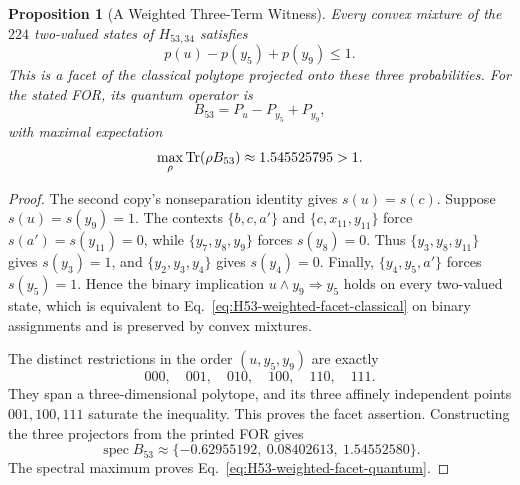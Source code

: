 \documentclass[aps,pra,reprint,superscriptaddress,longbibliography,nofootinbib,floatfix,10pt]{revtex4-2}
\newtheorem{proposition}[theorem]{Proposition}
\theoremstyle{definition}\newtheorem{definition}[theorem]{Definition}
\theoremstyle{remark}\newtheorem{remark}[theorem]{Remark}
\begin{document}
\begin{proposition}[A Weighted Three-Term Witness]\label{prop:H53-weighted-facet}
Every convex mixture of the $224$ two-valued states of $H_{53,34}$ satisfies
\begin{equation}\label{eq:H53-weighted-facet-classical}
\boxed{p(u)-p(y_5)+p(y_9)\le1.}
\end{equation}
This is a facet of the classical polytope projected onto these three probabilities. For the stated FOR, its quantum operator is
\begin{equation}\label{eq:H53-weighted-facet-operator}
B_{53}=P_u-P_{y_5}+P_{y_9},
\end{equation}
with maximal expectation
\begin{equation}\label{eq:H53-weighted-facet-quantum}
\max_\rho\operatorname{Tr}(\rho B_{53})\approx1.545525795>1.
\end{equation}
\end{proposition}
\begin{proof}
The second copy's nonseparation identity gives $s(u)=s(c)$. Suppose $s(u)=s(y_9)=1$. The contexts $\{b,c,a'\}$ and $\{c,x_{11},y_{11}\}$ force $s(a')=s(y_{11})=0$, while $\{y_7,y_8,y_9\}$ forces $s(y_8)=0$. Thus $\{y_3,y_8,y_{11}\}$ gives $s(y_3)=1$, and $\{y_2,y_3,y_4\}$ gives $s(y_4)=0$. Finally, $\{y_4,y_5,a'\}$ forces $s(y_5)=1$. Hence the binary implication $u\wedge y_9\Rightarrow y_5$ holds on every two-valued state, which is equivalent to Eq.~\eqref{eq:H53-weighted-facet-classical} on binary assignments and is preserved by convex mixtures.

The distinct restrictions in the order $(u,y_5,y_9)$ are exactly
\[
000,\quad001,\quad010,\quad100,\quad110,\quad111.
\]
They span a three-dimensional polytope, and its three affinely independent points $001,100,111$ saturate the inequality. This proves the facet assertion. Constructing the three projectors from the printed FOR gives
\begin{equation}\label{eq:H53-weighted-facet-spectrum}
\operatorname{spec}B_{53}\approx
\{-0.62955192,\ 0.08402613,\ 1.54552580\}.
\end{equation}
The spectral maximum proves Eq.~\eqref{eq:H53-weighted-facet-quantum}.
\end{proof}
\end{document}
